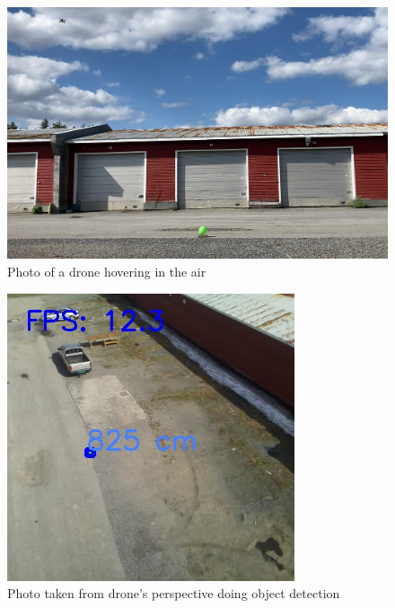 \begin{figure}[!htb]
    \centering
    \includegraphics[width=\textwidth]{fig/drone/drone_airshot_3p.png}
    \caption{Photo of a drone hovering in the air}
\end{figure}

\newpage

\begin{figure}[!htb]
    \centering
    \includegraphics[width=\textwidth]{fig/drone/drone_airshot_1p.png}
    \caption{Photo taken from drone's perspective doing object detection}
\end{figure}
